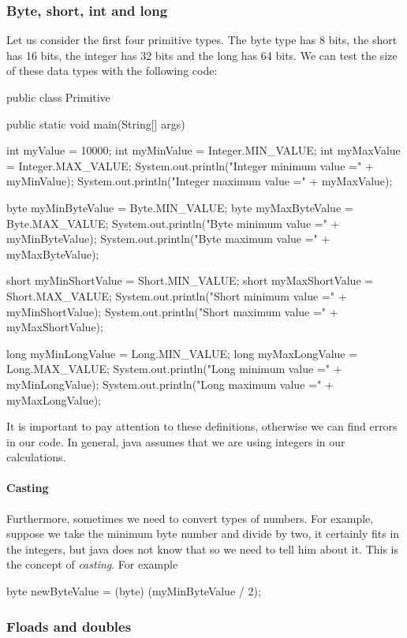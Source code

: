 \subsubsection{Byte, short, int and long}

Let us consider the first four primitive types. The byte type has 8 bits, the short has 16 bits, 
the integer has 32 bits and the long has 64 bits. We can test the size of these data types with 
the following code:
\begin{listing}{1}
public class Primitive {
    public static void main(String[] args) {
        int myValue = 10000;
        int myMinValue = Integer.MIN_VALUE;
        int myMaxValue = Integer.MAX_VALUE;
        System.out.println("Integer minimum value =" + myMinValue);
        System.out.println("Integer maximum value =" + myMaxValue);

        byte myMinByteValue = Byte.MIN_VALUE;
        byte myMaxByteValue = Byte.MAX_VALUE;
        System.out.println("Byte minimum value =" + myMinByteValue);
        System.out.println("Byte maximum value =" + myMaxByteValue);

        short myMinShortValue = Short.MIN_VALUE;
        short myMaxShortValue = Short.MAX_VALUE;
        System.out.println("Short minimum value =" + myMinShortValue);
        System.out.println("Short maximum value =" + myMaxShortValue);

        long myMinLongValue = Long.MIN_VALUE;
        long myMaxLongValue = Long.MAX_VALUE;
        System.out.println("Long minimum value =" + myMinLongValue);
        System.out.println("Long maximum value =" + myMaxLongValue);
    }
}
\end{listing}
It is important to pay attention to these definitions, otherwise we can find errors in our code. 
In general, java assumes that we are using integers in our calculations. 
\paragraph{Casting} Furthermore, sometimes we need to convert types of numbers. For example, suppose we take the 
minimum byte number and divide by two, it certainly fits in the integers, but java does not know that
so we need to tell him about it. This is the concept of \emph{casting}. For example 
\begin{listing}{1}
byte newByteValue = (byte) (myMinByteValue / 2);
\end{listing}

\subsubsection{Floads and doubles}

